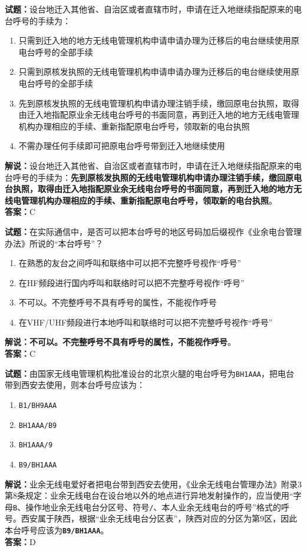 \documentclass{ctexbook}
\begin{document}
\bigskip

\noindent\textbf{试题：}设台地迁入其他省、自治区或者直辖市时，申请在迁入地继续指配原来的电台呼号的手续为：
\begin{enumerate}[leftmargin=3em]
  \item 只需到迁入地的地方无线电管理机构申请申请办理为迁移后的电台继续使用原电台呼号的全部手续
  \item 只需到原核发执照的无线电管理机构申请申请办理为迁移后的电台继续使用原电台呼号的全部手续
  \item 先到原核发执照的无线电管理机构申请办理注销手续，缴回原电台执照，取得由迁入地指配原业余无线电台呼号的书面同意，再到迁入地的地方无线电管理机构办理相应的手续、重新指配原电台呼号，领取新的电台执照
  \item 不需办理任何手续即可把原电台呼号带到迁入地继续使用
\end{enumerate}
\noindent\textbf{解说：}设台地迁入其他省、自治区或者直辖市时，申请在迁入地继续指配原来的电台呼号的手续为：\textbf{先到原核发执照的无线电管理机构申请办理注销手续，缴回原电台执照，取得由迁入地指配原业余无线电台呼号的书面同意，再到迁入地的地方无线电管理机构办理相应的手续、重新指配原电台呼号，领取新的电台执照}。\\\noindent\textbf{答案：}C

\bigskip

\noindent\textbf{试题：}在实际通信中，是否可以把本台呼号的地区号码加后缀视作《业余电台管理办法》所说的“本台呼号”？
\begin{enumerate}[leftmargin=3em]
  \item 在熟悉的友台之间呼叫和联络中可以把不完整呼号视作“呼号”
  \item 在HF频段进行国内呼叫和联络时可以把不完整呼号视作“呼号”
  \item 不可以。不完整呼号不具有呼号的属性，不能视作呼号
  \item 在VHF/UHF频段进行本地呼叫和联络时可以把不完整呼号视作“呼号”
\end{enumerate}
\textbf{解说：不可以。不完整呼号不具有呼号的属性，不能视作呼号}。\\\noindent\textbf{答案：}C

\bigskip

\noindent\textbf{试题：}由国家无线电管理机构批准设台的北京火腿的电台呼号为\texttt{BH1AAA}，把电台带到西安去使用，则本台呼号应该为：
\begin{enumerate}[leftmargin=3em]
  \item \texttt{B1/BH9AAA}
  \item \texttt{BH1AAA/B9}
  \item \texttt{BH1AAA/9}
  \item \texttt{B9/BH1AAA}
\end{enumerate}
\noindent\textbf{解说：}业余无线电爱好者把电台带到西安去使用，《业余无线电台管理办法》附录3第8条规定：业余无线电台在设台地以外的地点进行异地发射操作的，应当使用“字母\texttt{B}、操作地业余无线电台分区号、符号\texttt{/}、本人业余无线电台的呼号”格式的呼号。西安属于陕西，根据“业余无线电台分区表”，陕西对应的分区为第9区，因此本台呼号应该为\texttt{\textbf{B9/BH1AAA}}。\\\noindent\textbf{答案：}D
\end{document}
